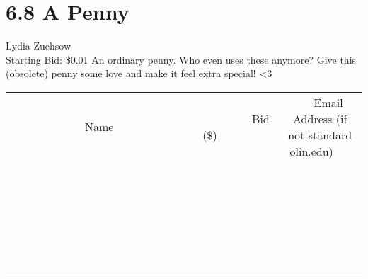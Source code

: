 \documentclass[11pt]{article}
\begin{document}
\section*{6.8 A Penny}
Lydia Zuehsow
\\
Starting Bid: \$0.01
\newline
An ordinary penny. Who even uses these anymore?
Give this (obsolete) penny some love and make it feel extra special! \textless 3
\\[6ex]
\begin{tabular}{c c c}
~~~~~~~~~~~~~Name~~~~~~~~~~~~~ & ~~~~~~~~~Bid (\$)~~~~~~~~~  & ~~~Email Address (if not standard olin.edu)~~~\\
 & & \\
\hline
 & & \\
\hline
 & & \\
\hline
 & & \\
\hline
 & & \\
\hline
 & & \\
\hline
 & & \\
\hline
 & & \\
\hline
 & & \\
\hline
 & & \\
\hline
 & & \\
\hline
 & & \\
\hline
 & & \\
\hline
 & & \\
\hline
 & & \\
\hline
 & & \\
\hline
 & & \\
\hline
 & & \\
\hline
 & & \\
\hline
 & & \\
\hline
 & & \\
\hline
 & & \\
\hline
 & & \\
\hline
 & & \\
\hline
 & & \\
\hline
 & & \\
\hline
\end{tabular}
\newpage
\end{document}
